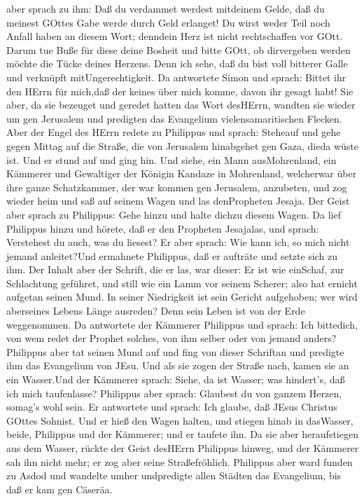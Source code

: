 aber sprach zu ihm: Daß du verdammet werdest mitdeinem Gelde, daß du
meinest GOttes Gabe werde durch Geld erlanget!  Du wirst
weder Teil noch Anfall haben an diesem Wort; denndein Herz ist nicht
rechtschaffen vor GOtt.  Darum tue Buße für diese deine
Bosheit und bitte GOtt, ob dirvergeben werden möchte die Tücke deines
Herzens.  Denn ich sehe, daß du bist voll bitterer Galle
und verknüpft mitUngerechtigkeit.  Da antwortete Simon und
sprach: Bittet ihr den HErrn für mich,daß der keines über mich komme,
davon ihr gesagt habt!  Sie aber, da sie bezeuget und
geredet hatten das Wort desHErrn, wandten sie wieder um gen Jerusalem
und predigten das Evangelium vielensamaritischen Flecken. 
Aber der Engel des HErrn redete zu Philippus und sprach: Steheauf und
gehe gegen Mittag auf die Straße, die von Jerusalem hinabgehet gen Gaza,
dieda wüste ist.  Und er stund auf und ging hin. Und siehe,
ein Mann ausMohrenland, ein Kämmerer und Gewaltiger der Königin Kandaze
in Mohrenland, welcherwar über ihre ganze Schatzkammer, der war kommen
gen Jerusalem, anzubeten,  und zog wieder heim und saß auf
seinem Wagen und las denPropheten Jesaja.  Der Geist aber
sprach zu Philippus: Gehe hinzu und halte dichzu diesem Wagen.
 Da lief Philippus hinzu und hörete, daß er den Propheten
Jesajalas, und sprach: Verstehest du auch, was du liesest? 
Er aber sprach: Wie kann ich, so mich nicht jemand anleitet?Und
ermahnete Philippus, daß er aufträte und setzte sich zu ihm.
 Der Inhalt aber der Schrift, die er las, war dieser: Er
ist wie einSchaf, zur Schlachtung geführet, und still wie ein Lamm vor
seinem Scherer; also hat ernicht aufgetan seinen Mund.  In
seiner Niedrigkeit ist sein Gericht aufgehoben; wer wird aberseines
Lebens Länge ausreden? Denn sein Leben ist von der Erde weggenommen.
 Da antwortete der Kämmerer Philippus und sprach: Ich
bittedich, von wem redet der Prophet solches, von ihm selber oder von
jemand anders?  Philippus aber tat seinen Mund auf und fing
von dieser Schriftan und predigte ihm das Evangelium von JEsu.
 Und als sie zogen der Straße nach, kamen sie an ein
Wasser.Und der Kämmerer sprach: Siehe, da ist Wasser; was hindert's, daß
ich mich taufenlasse?  Philippus aber sprach: Glaubest du
von ganzem Herzen, somag's wohl sein. Er antwortete und sprach: Ich
glaube, daß JEsus Christus GOttes Sohnist.  Und er hieß den
Wagen halten, und stiegen hinab in dasWasser, beide, Philippus und der
Kämmerer; und er taufete ihn.  Da sie aber heraufstiegen
aus dem Wasser, rückte der Geist desHErrn Philippus hinweg, und der
Kämmerer sah ihn nicht mehr; er zog aber seine Straßefröhlich.
 Philippus aber ward funden zu Asdod und wandelte umher
undpredigte allen Städten das Evangelium, bis daß er kam gen Cäseräa.

